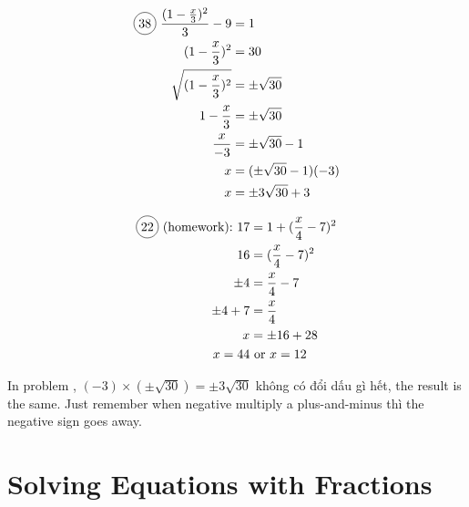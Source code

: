 \begin{multicols}{2}
\begin{align*}
  \circled{38}\ \frac{(1-\frac{x}{3})^{2}}{3}-9&=1\\
  (1-\frac{x}{3})^{2}&=30\\
  \sqrt{(1-\frac{x}{3})^{2}}&=\pm\sqrt{30}\\
  1-\frac{x}{3}&=\pm\sqrt{30}\\
  \frac{x}{-3}&=\pm\sqrt{30}-1\\
  x&=(\pm\sqrt{30}-1)(-3)\\
  x&=\pm 3\sqrt{30}+3
\end{align*}

\begin{align*}
  \circled{22}\ \text{(homework):}\ 17&=1+(\frac{x}{4}-7)^{2}\\
  16&=(\frac{x}{4}-7)^{2}\\
  \pm 4&=\frac{x}{4}-7\\
  \pm 4+7&=\frac{x}{4}\\
  x&=\pm 16+28\\
  x=44 &\text{ or }x=12
\end{align*}
\end{multicols}

In problem , $(-3)\times(\pm\sqrt{30})=\pm 3\sqrt{30}$ không có đổi dấu gì hết, the result is the same. Just remember when negative multiply a plus-and-minus thì the negative sign goes away.

\section{Solving Equations with Fractions}

